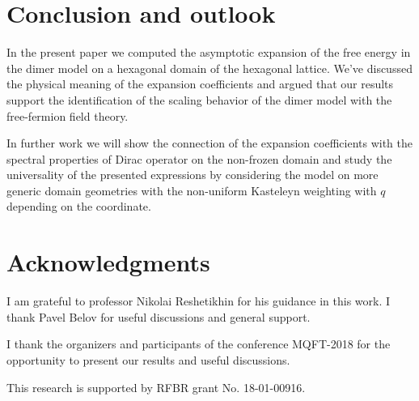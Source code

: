 \documentclass{article}
\begin{document}
\section*{Conclusion and outlook}
\label{sec:conclusion}

In the present paper we computed the asymptotic expansion of the free energy in the dimer model on a
hexagonal domain of the hexagonal lattice. We've discussed the physical meaning of the expansion
coefficients and argued that our results support the identification of the scaling behavior of the
dimer model with the free-fermion field theory.

In further work we will show the connection of the expansion coefficients with the spectral
properties of Dirac operator on the non-frozen domain and study the universality of the presented
expressions by considering the model on more generic domain geometries with the non-uniform
Kasteleyn weighting with $q$ depending on the coordinate.

\section*{Acknowledgments}
\label{sec:acknowledgements}
I am grateful to professor Nikolai Reshetikhin for his guidance in this work. I thank Pavel Belov
for useful discussions and general support.

I thank the organizers and participants of the conference MQFT-2018 for the opportunity
to present our results and useful discussions.

This research is supported by RFBR grant No. 18-01-00916.


{} 
\end{document}
